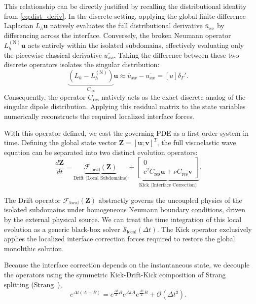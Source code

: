 \documentclass{Configuration_Files/PoliMi3i_thesis}
\begin{document}
This relationship can be directly justified by recalling the distributional identity from \eqref{eq:dist_deriv}. In the discrete setting, applying the global finite-difference Laplacian $L_h \mathbf{u}$ natively evaluates the full distributional derivative $\bar{u}_{xx}$ by differencing across the interface. Conversely, the broken Neumann operator $L_h^{(\mathrm N)} \mathbf{u}$ acts entirely within the isolated subdomains, effectively evaluating only the piecewise classical derivative $\overline{u_{xx}}$. Taking the difference between these two discrete operators isolates the singular distribution:
\[
\underbrace{(L_h - L_h^{(\mathrm N)})}_{C_{\mathrm{res}}} \mathbf{u} \approx \bar{u}_{xx} - \overline{u_{xx}} = [u]\delta_\Gamma'.
\]
Consequently, the operator $C_{\mathrm{res}}$ natively acts as the exact discrete analog of the singular dipole distribution. Applying this residual matrix to the state variables numerically reconstructs the required localized interface forces.

With this operator defined, we cast the governing PDE as a first-order system in time. Defining the global state vector $\mathbf Z=[\mathbf u;\mathbf v]^T$, the full viscoelastic wave equation can be separated into two distinct evolution operators:
\begin{equation*}
\frac{d\mathbf Z}{dt}
=
\underbrace{
\mathcal{F}_{\mathrm{local}}(\mathbf Z)
}_{\text{Drift (Local Subdomains)}}
+
\underbrace{
\begin{bmatrix}
0\\
c^2C_{\mathrm{res}}\mathbf u+\nu C_{\mathrm{res}}\mathbf v
\end{bmatrix}
}_{\text{Kick (Interface Correction)}}.
\end{equation*}

The Drift operator $\mathcal{F}_{\mathrm{local}}(\mathbf Z)$ abstractly governs the uncoupled physics of the isolated subdomains under homogeneous Neumann boundary conditions, driven by the external physical source. We can treat the time integration of this local evolution as a generic black-box solver $\mathcal S_{\mathrm{local}}(\Delta t)$. 
The Kick operator exclusively applies the localized interface correction forces required to restore the global monolithic solution.

Because the interface correction depends on the instantaneous state, we decouple the operators using the symmetric Kick-Drift-Kick composition of Strang splitting (Strang~\cite{strang_construction_1968}),
\begin{equation*}
e^{\Delta t(A+B)}
=
e^{\frac{\Delta t}{2}B}
e^{\Delta t A}
e^{\frac{\Delta t}{2}B}
+
\mathcal O(\Delta t^3).
\end{equation*}
\end{document}
